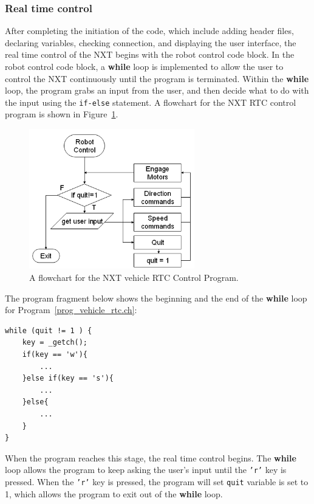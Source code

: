 \documentclass[11pt]{article}
\begin{document}
\subsubsection*{Real time control}
After completing the initiation of the code, which include adding header files, 
declaring variables, checking connection, and displaying the user interface, 
the real time control of the NXT begins with the robot control code block. In 
the robot control code block, a {\bf while} loop is implemented to allow the 
user to control the NXT continuously until the program is terminated. Within 
the {\bf while} loop, the program grabs an input from the user, and then decide 
what to do with the input using the {\tt if-else} statement. A flowchart 
for the NXT RTC control program is shown in Figure~\ref{fig_RTC_controlloop}.\\
\begin{figure}[h]
  \begin{center}
    \includegraphics[height=2.4in]{figure/mindstorm/RTC_controlloop.png}
    \caption{A flowchart for the NXT vehicle RTC Control Program.
    \label{fig_RTC_controlloop}}
  \end{center}
\end{figure}
The program fragment below shows the beginning and the end of the {\bf while} 
loop for Program~\ref{prog_vehicle_rtc.ch}:
\begin{lstlisting}
while (quit != 1 ) {
    key = _getch();
    if(key == 'w'){
        ...
    }else if(key == 's'){
        ...
    }else{
        ...
    }
}
\end{lstlisting}
When the program reaches this stage, the real time control begins. The {\bf while} 
loop allows the program to keep asking the user's input until the {\tt 'r'} key 
is pressed. When the {\tt 'r'} key is pressed, the program will set {\tt quit} 
variable is set to 1, which allows the program to exit out of the {\bf while} loop.\\
\end{document}
